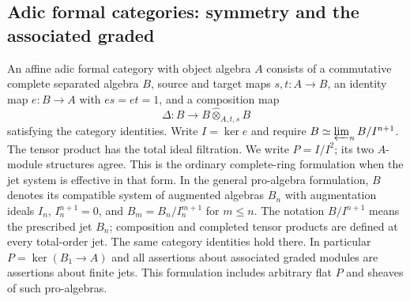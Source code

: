 \subsection{Adic formal categories: symmetry and the associated graded}
An affine adic formal category with object algebra $A$ consists of a
commutative complete separated algebra $B$, source and target maps
$s,t:A\to B$, an identity map $e:B\to A$ with $es=et=1$, and a
composition map
\[
 \Delta:B\longrightarrow B\widehat\otimes_{A,t,s} B
\]
satisfying the category identities.  Write $I=\ker e$ and require
$B\simeq\varprojlim_n B/I^{n+1}$.  The tensor product has the total
ideal filtration.  We write $P=I/I^2$; its two $A$-module structures
agree.  This is the ordinary complete-ring formulation when the jet
system is effective in that form.  In the general pro-algebra
formulation, $B$ denotes its compatible system of augmented algebras
$B_n$ with augmentation ideals $I_n$, $I_n^{n+1}=0$, and
$B_m=B_n/I_n^{m+1}$ for $m\leq n$.  The notation $B/I^{n+1}$ means
the prescribed jet $B_n$; composition and completed tensor products
are defined at every total-order jet.  The same category identities
hold there.  In particular $P=\ker(B_1\to A)$ and all assertions about
associated graded modules are assertions about finite jets.  This
formulation includes arbitrary flat $P$ and sheaves of such pro-algebras.

